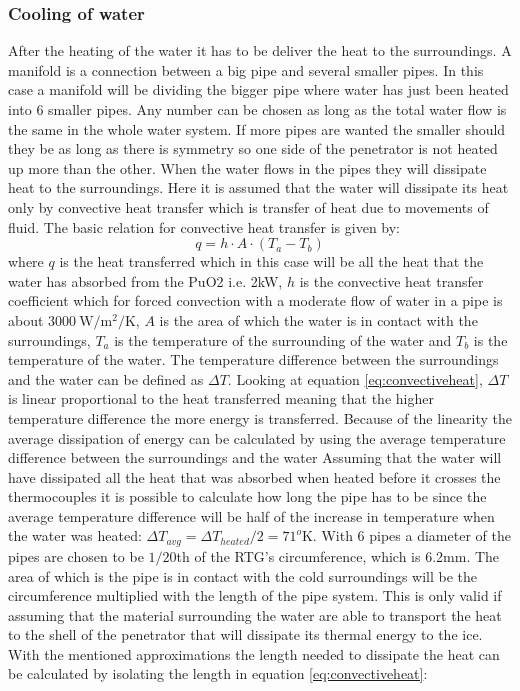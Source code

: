 \subsubsection{Cooling of water}
After the heating of the water it has to be deliver the heat to the surroundings. A manifold is a connection between a big pipe and several smaller pipes. In this case a manifold will be dividing the bigger pipe where water has just been heated into 6 smaller pipes. Any number can be chosen as long as the total water flow is the same in the whole water system. If more pipes are wanted the smaller should they be as long as there is symmetry so one side of the penetrator is not heated up more than the other. When the water flows in the pipes they will dissipate heat to the surroundings. Here it is assumed that the water will dissipate its heat only by convective heat transfer which is transfer of heat due to movements of fluid. The basic relation for convective heat transfer is given by:
\begin{equation}\label{eq:convectiveheat}
q = h \cdot A \cdot (T_a - T_b)
\end{equation}
where $q$ is the heat transferred which in this case will be all the heat that the water has absorbed from the PuO2 i.e. 2kW, $h$ is the convective heat transfer coefficient which for forced convection with a moderate flow of water in a pipe is about $\SI{3000}{\W\per\m^2\per\K}$\cite{website:waterconvection}, $A$ is the area of which the water is in contact with the surroundings, $T_a$ is the temperature of the surrounding of the water and $T_b$ is the temperature of the water. The temperature difference between the surroundings and the water can be defined as $\Delta T$. Looking at equation \ref{eq:convectiveheat}, $\Delta T$ is linear proportional to the heat transferred meaning that the higher temperature difference the more energy is transferred. Because of the linearity the average dissipation of energy can be calculated by using the average temperature difference between the surroundings and the water Assuming that the water will have dissipated all the heat that was absorbed when heated before it crosses the thermocouples it is possible to calculate how long the pipe has to be since the average temperature difference will be half of the increase in temperature when the water was heated: $\Delta T_{avg} = \Delta T_{heated} / 2 = 71^o$K. With 6 pipes a diameter of the pipes are chosen to be $1/20$th of the RTG's circumference, which is 6.2mm.
The area of which is the pipe is in contact with the cold surroundings will be the circumference multiplied with the length of the pipe system. This is only valid if assuming that the material surrounding the water are able to transport the heat to the shell of the penetrator that will dissipate its thermal energy to the ice. With the mentioned approximations the length needed to dissipate the heat can be calculated by isolating the length in equation \ref{eq:convectiveheat}:
